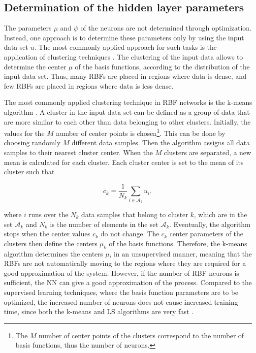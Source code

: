 \subsection{Determination of the hidden layer parameters}
\label{determination_hidden_layer}

The parameters $\mu$ and $\psi$ of the neurons are not determined through optimization. Instead, one approach is to determine these parameters only by using the input data set $u$. The most commonly applied approach for such tasks is the application of clustering techniques \cite{nelles2013nonlinear}. The clustering of the input data allows to determine the center $\mu$ of the basis functions, according to the distribution of the input data set. Thus, many RBFs are placed in regions where data is dense, and few RBFs are placed in regions where data is less dense.  

The most commonly applied clustering technique in RBF networks is the k-means algorithm \cite{nelles2013nonlinear}. A cluster in the input data set can be defined as a group of data that are more similar to each other than data belonging to other clusters. Initially, the values for the $M$ number of center points is chosen\footnote{The $M$ number of center points of the clusters correspond to the number of basis functions, thus the number of neurons.}. This can be done by choosing randomly $M$ different data samples. Then the algorithm assigns all data samples to their nearest cluster center. When the $M$ clusters are separated, a new mean is calculated for each cluster. Each cluster center is set to the mean of its cluster such that

\begin{equation}
\label{cluster_center1}
c_k = \frac{1}{N_k} \sum_{i \in \mathcal{A}_k}  u_i,
\end{equation}

where $i$ runs over the $N_k$ data samples that belong to cluster $k$, which are in the set $\mathcal{A}_k$ and $N_k$ is the number of elements in the set $\mathcal{A}_k$. Eventually, the algorithm stops when the center values $c_k$ do not change. The $c_k$ center parameters of the clusters then define the centers $\mu_k$ of the basis functions. Therefore, the k-means algorithm determines the centers $\mu$, in an unsupervised manner, meaning that the RBFs are not automatically moving to the regions where they are required for a good approximation of the system. However, if the number of RBF neurons is sufficient, the NN can give a good approximation of the process. Compared to the supervised learning techniques, where the basis function parameters are to be optimized, the increased number of neurons does not cause increased training time, since both the k-means and LS algorithms are very fast \cite{nelles2013nonlinear}. 

